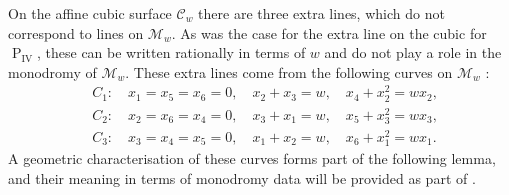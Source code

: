\documentclass[a4paper,reqno]{amsart}
\numberwithin{equation}{section}
\newcommand{\pain}[1]{\operatorname{P}_{\mathrm{#1}}}
\numberwithin{equation}{section}
\begin{document}
 On the affine cubic surface $\mathcal{C}_w$ there are three extra lines, which do not correspond to lines on $\mathcal{M}_w$.
As was the case for the extra line on the cubic for $\pain{IV}$, these can be written rationally in terms of $w$ and do not play a role in the monodromy of $\mathcal{M}_w$. 
These extra lines come from the following curves on $\mathcal{M}_w$ : 
\begin{equation*}
    \begin{aligned}
    &C_1 : \quad x_1 = x_5 =x_6 = 0,\quad x_2+x_3=w, \quad x_4 +x_2^2= w x_2,\\
    &C_2 : \quad x_2 = x_6 =x_4 = 0,\quad x_3+x_1=w, \quad x_5 +x_3^2= w x_3,\\
    &C_3 : \quad x_3 = x_4 =x_5 = 0,\quad x_1+x_2=w, \quad x_6 +x_1^2= w x_1.
    \end{aligned}
\end{equation*}
A geometric characterisation of these curves forms part of the following lemma, and their meaning in terms of monodromy data will be provided as part of  .
\end{document}
